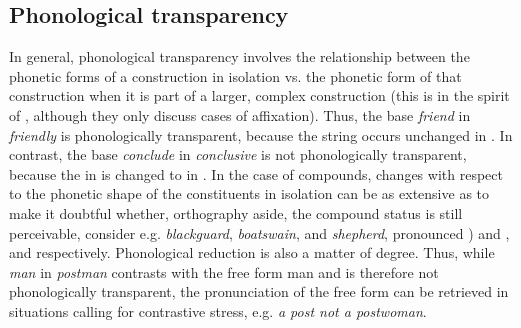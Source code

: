 \subsection{Phonological transparency}
In general, phonological transparency
involves the relationship between the phonetic forms of a
construction in isolation vs. the phonetic form of that construction
when it is part of a larger, complex construction (this is in the spirit of
\citealt[5]{Marslen-Wilsonetal:1994}, although they only discuss cases of affixation).
Thus, the base \emph{friend} in \emph{friendly} is phonologically transparent, because
the string \textipa{[frend]} occurs unchanged in \textipa{[frendlI]}. In
contrast, the base \emph{conclude} in \emph{conclusive} is not phonologically
transparent, because the \textipa{[d]} in \textipa{[k@nklu:d]} is changed to
\textipa{[s]} in . In the case of compounds, changes with
respect to the phonetic shape of the constituents in isolation can be
as extensive
as to make it doubtful whether, orthography aside, the compound status is still
perceivable, consider e.g. \emph{blackguard},  \emph{boatswain}, and \emph{shepherd},
pronounced ) and , and
 respectively. 
Phonological reduction is also a matter of degree. Thus, while \emph{man} in
\emph{postman} \textipa{[poUstm@n]} contrasts with the free form man
\textipa{[m\ae n]} and is therefore not
phonologically transparent, the pronunciation of the free form can be
retrieved in situations calling for contrastive stress, e.g. \emph{a post\textipa{[m\ae n]} not a postwoman}.  

